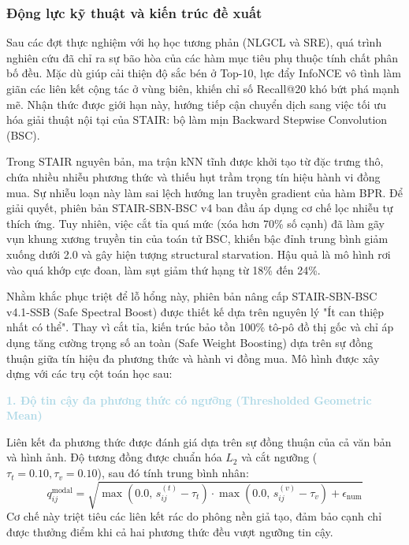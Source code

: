 \subsubsection{Động lực kỹ thuật và kiến trúc đề xuất}

Sau các đợt thực nghiệm với họ học tương phản (NLGCL và SRE), quá trình nghiên cứu đã chỉ ra sự bão hòa của các hàm mục tiêu phụ thuộc tính chất phân bố đều. Mặc dù giúp cải thiện độ sắc bén ở Top-10, lực đẩy InfoNCE vô tình làm giãn các liên kết cộng tác ở vùng biên, khiến chỉ số Recall@20 khó bứt phá mạnh mẽ. Nhận thức được giới hạn này, hướng tiếp cận chuyển dịch sang việc tối ưu hóa giải thuật nội tại của STAIR: bộ làm mịn Backward Stepwise Convolution (BSC).

Trong STAIR nguyên bản, ma trận kNN tĩnh được khởi tạo từ đặc trưng thô, chứa nhiều nhiễu phương thức và thiếu hụt trầm trọng tín hiệu hành vi đồng mua. Sự nhiễu loạn này làm sai lệch hướng lan truyền gradient của hàm BPR. Để giải quyết, phiên bản STAIR-SBN-BSC v4 ban đầu áp dụng cơ chế lọc nhiễu tự thích ứng. Tuy nhiên, việc cắt tỉa quá mức (xóa hơn 70\% số cạnh) đã làm gãy vụn khung xương truyền tin của toán tử BSC, khiến bậc đỉnh trung bình giảm xuống dưới 2.0 và gây hiện tượng structural starvation. Hậu quả là mô hình rơi vào quá khớp cực đoan, làm sụt giảm thứ hạng từ 18\% đến 24\%.

Nhằm khắc phục triệt để lỗ hổng này, phiên bản nâng cấp STAIR-SBN-BSC v4.1-SSB (Safe Spectral Boost) được thiết kế dựa trên nguyên lý "Ít can thiệp nhất có thể". Thay vì cắt tỉa, kiến trúc bảo tồn 100\% tô-pô đồ thị gốc và chỉ áp dụng tăng cường trọng số an toàn (Safe Weight Boosting) dựa trên sự đồng thuận giữa tín hiệu đa phương thức và hành vi đồng mua. Mô hình được xây dựng với các trụ cột toán học sau:

\medskip
\noindent\textcolor{lightblue}{\textbf{1. Độ tin cậy đa phương thức có ngưỡng (Thresholded Geometric Mean)}}

Liên kết đa phương thức được đánh giá dựa trên sự đồng thuận của cả văn bản và hình ảnh. Độ tương đồng được chuẩn hóa $L_2$ và cắt ngưỡng ($\tau_t = 0.10, \tau_v = 0.10$), sau đó tính trung bình nhân:
\begin{equation}
q_{ij}^{\text{modal}} = \sqrt{ \max\left(0.0, \, s_{ij}^{(t)} - \tau_t\right) \cdot \max\left(0.0, \, s_{ij}^{(v)} - \tau_v\right) + \epsilon_{\text{num}} }
\end{equation}
Cơ chế này triệt tiêu các liên kết rác do phông nền giả tạo, đảm bảo cạnh chỉ được thưởng điểm khi cả hai phương thức đều vượt ngưỡng tin cậy.

